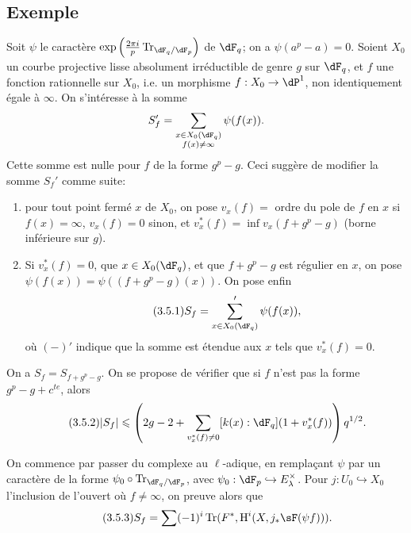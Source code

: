\subsection{Exemple}\label{VI:3-5}

Soit $\psi$ le caractère 
$\exp\left(\frac{2\pi i}{p} \tr_{\dF_q/\dF_p}\right)$ de $\dF_q$; on a 
$\psi(a^p-a)=0$. Soient $X_0$ un courbe projective lisse absolument 
irréductible de genre $g$ sur $\dF_q$, et $f$ une fonction rationnelle sur 
$X_0$, i.e. un morphisme $f:X_0 \to \dP^1$, non identiquement égale à 
$\infty$. On s'intéresse à la somme 
\[
  S_f' = \sum_{\substack{x\in X_0(\dF_q) \\ f(x)\ne \infty}} \psi(f(x)) 
  \text{.}
\]
Cette somme est nulle pour $f$ de la forme $g^p-g$. Ceci suggère de 
modifier la somme $S_f'$ comme suite: 
\begin{enumerate}[\indent a)]
  \item pour tout point fermé $x$ de $X_0$, on pose $v_x(f) = $ ordre du 
    pole de $f$ en $x$ si $f(x)=\infty$, $v_x(f)=0$ sinon, et 
    $v_x^\ast(f) = \inf v_x(f+g^p-g)$ (borne inférieure sur $g$). 
  \item Si $v_x^\ast(f)=0$, que $x\in X_0(\dF_q)$, et que $f+g^p-g$ est 
    régulier en $x$, on pose $\psi(f(x)) = \psi((f+g^p-g)(x))$. On pose enfin 
    \begin{equation*}\tag{3.5.1}\label{VI:eq:3-5-1}
      S_f = \sum'_{x\in X_0(\dF_q)} \psi(f(x)) \text{,}
    \end{equation*}
    où $(-)'$ indique que la somme est étendue aux $x$ tels que 
    $v_x^\ast(f)=0$. 
\end{enumerate}

On a $S_f=S_{f+g^p-g}$. On se propose de vérifier que si $f$ n'est pas la 
forme $g^p-g+c^{t e}$, alors 
\begin{equation*}\tag{3.5.2}\label{VI:eq:3-5-2}
  |S_f|\leqslant \left(2 g-2+\sum_{v_x^\ast(f)\ne 0} [k(x):\dF_q] (1+v_x^\ast(f))\right) q^{1/2} \text{.}
\end{equation*}

On commence par passer du complexe au $\ell$-adique, en remplaçant $\psi$ par 
un caractère de la forme $\psi_0\circ \tr_{\dF_q/\dF_p}$, avec 
$\psi_0:\dF_p\hookrightarrow E_\lambda^\times$. Pour $j:U_0\hookrightarrow X_0$ 
l'inclusion de l'ouvert où $f\ne\infty$, on preuve alors que 
\begin{equation*}\tag{3.5.3}\label{VI:eq:3-5-3}
  S_f = \sum (-1)^i \tr(F^\ast,\h^i(X,j_\ast \sF(\psi f))) \text{.} 
\end{equation*}

